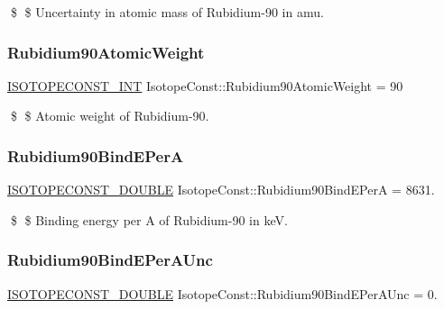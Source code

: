 \$ \$ Uncertainty in atomic mass of Rubidium-\/90 in amu. \mbox{\label{group___isotope_const-_rubidium-_rb90_gaa652547e419402d80f3678efcb45b18d}} 
\subsubsection{\texorpdfstring{Rubidium90\+Atomic\+Weight}{Rubidium90AtomicWeight}}
{\footnotesize\ttfamily \mbox{\hyperlink{group___isotope_const-_macros_ga5f18360b3e99483a35c32d789e62621c}{I\+S\+O\+T\+O\+P\+E\+C\+O\+N\+S\+T\+\_\+\+I\+NT}} Isotope\+Const\+::\+Rubidium90\+Atomic\+Weight = 90}

\$ \$ Atomic weight of Rubidium-\/90. \mbox{\label{group___isotope_const-_rubidium-_rb90_gaf7c69fd593031d2c2beec0cfc803ad12}} 
\subsubsection{\texorpdfstring{Rubidium90\+Bind\+E\+PerA}{Rubidium90BindEPerA}}
{\footnotesize\ttfamily \mbox{\hyperlink{group___isotope_const-_macros_ga8f45a7272ce02c0b4c65c44636ed719a}{I\+S\+O\+T\+O\+P\+E\+C\+O\+N\+S\+T\+\_\+\+D\+O\+U\+B\+LE}} Isotope\+Const\+::\+Rubidium90\+Bind\+E\+PerA = 8631.}

\$ \$ Binding energy per A of Rubidium-\/90 in keV. \mbox{\label{group___isotope_const-_rubidium-_rb90_ga82ed6f5499b71646281cf14865704dca}} 
\subsubsection{\texorpdfstring{Rubidium90\+Bind\+E\+Per\+A\+Unc}{Rubidium90BindEPerAUnc}}
{\footnotesize\ttfamily \mbox{\hyperlink{group___isotope_const-_macros_ga8f45a7272ce02c0b4c65c44636ed719a}{I\+S\+O\+T\+O\+P\+E\+C\+O\+N\+S\+T\+\_\+\+D\+O\+U\+B\+LE}} Isotope\+Const\+::\+Rubidium90\+Bind\+E\+Per\+A\+Unc = 0.}

